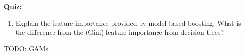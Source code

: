 \textbf{Quiz:}
\begin{enumerate}
   	\item Explain the feature importance provided by model-based boosting. What is the difference from the (Gini) feature importance from decision trees?
   	
\end{enumerate}

TODO: GAMs

